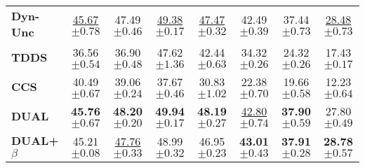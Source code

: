 \begin{table}[ht]
\begin{tabular}{lccccccc}
    \textbf{Dyn-Unc} & \underline{45.67} \scriptsize{$\pm 0.78  $} & 47.49 \scriptsize{$\pm 0.46 $} & \underline{49.38} \scriptsize{$\pm 0.17 $} & \underline{47.47} \scriptsize{$\pm 0.32 $} & 42.49 \scriptsize{$\pm 0.39$} & 37.44 \scriptsize{$\pm 0.73 $} & \underline{28.48} \scriptsize{$\pm 0.73 $} \\
    
    \textbf{TDDS} & 36.56 \scriptsize{$\pm 0.54$} & 36.90 \scriptsize{$\pm 0.48 $} & 47.62 \scriptsize{$\pm 1.36$} & 42.44 \scriptsize{$\pm 0.63$} & 34.32 \scriptsize{$\pm 0.26$}& 24.32 \scriptsize{$\pm 0.26 $} & 17.43 \scriptsize{$\pm 0.17$}  \\
    
    \textbf{CCS} & 40.49 \scriptsize{$\pm 0.67 $} & 39.06 \scriptsize{$\pm 0.24 $} & 37.67 \scriptsize{$\pm 0.46$} & 30.83 \scriptsize{$\pm 1.02$} & 22.38 \scriptsize{$\pm 0.70 $} & 19.66 \scriptsize{$\pm 0.58$} & 12.23 \scriptsize{$\pm 0.64$} \\
    
    \midrule
    
    \textbf{DUAL} & \textbf{45.76} \scriptsize{$\pm 0.67 $} & \textbf{48.20} \scriptsize{$\pm 0.20 $} & \textbf{49.94} \scriptsize{$\pm 0.17 $} & \textbf{48.19} \scriptsize{$\pm 0.27$} & \underline{42.80} \scriptsize{$\pm 0.74 $} & \textbf{37.90} \scriptsize{$\pm 0.59$} & 27.80 \scriptsize{$\pm 0.49 $} \\
    
    \textbf{DUAL+$\beta$} & 45.21  \scriptsize{$\pm 0.08$} & \underline{47.76} \scriptsize{$\pm 0.33$} & 48.99 \scriptsize{$\pm 0.32 $} & 46.95 \scriptsize{$\pm 0.23 $} & \textbf{43.01} \scriptsize{$\pm 0.43$} & \textbf{37.91} \scriptsize{$\pm 0.28 $} & \textbf{28.78} \scriptsize{$\pm 0.57$} \\
    
    \bottomrule
\end{tabular}

\end{table}


